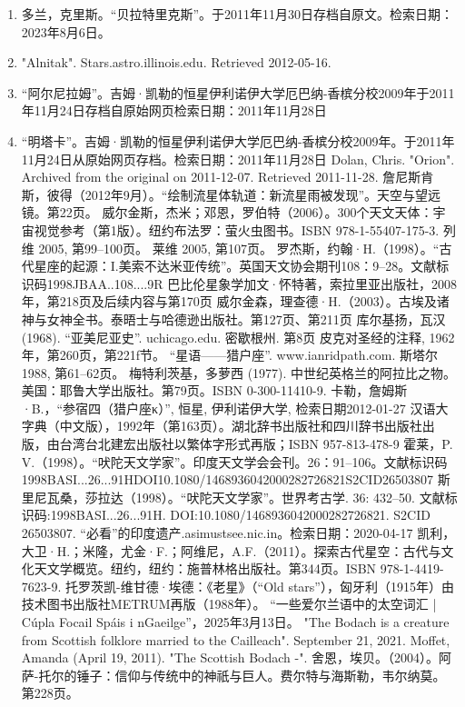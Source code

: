 \begin{enumerate}
\item 多兰，克里斯。“贝拉特里克斯”。于2011年11月30日存档自原文。检索日期：2023年8月6日。
\item "Alnitak". Stars.astro.illinois.edu. Retrieved 2012-05-16.
\item “阿尔尼拉姆”。吉姆·凯勒的恒星伊利诺伊大学厄巴纳-香槟分校2009年于2011年11月24日存档自原始网页检索日期：2011年11月28日
\item “明塔卡”。吉姆·凯勒的恒星伊利诺伊大学厄巴纳-香槟分校2009年。于2011年11月24日从原始网页存档。检索日期：2011年11月28日
 Dolan, Chris. "Orion". Archived from the original on 2011-12-07. Retrieved 2011-11-28.
 詹尼斯肯斯，彼得（2012年9月）。“绘制流星体轨道：新流星雨被发现”。天空与望远镜。第22页。
 威尔金斯，杰米；邓恩，罗伯特（2006）。300个天文天体：宇宙视觉参考（第1版）。纽约布法罗：萤火虫图书。ISBN 978-1-55407-175-3.
 列维 2005, 第99–100页。
 莱维 2005, 第107页。
 罗杰斯，约翰·H.（1998）。“古代星座的起源：I.美索不达米亚传统”。英国天文协会期刊108：9–28。文献标识码1998JBAA..108....9R
 巴比伦星象学加文·怀特著，索拉里亚出版社，2008年，第218页及后续内容与第170页
 威尔金森，理查德·H.（2003）。古埃及诸神与女神全书。泰晤士与哈德逊出版社。第127页、第211页
 库尔基扬，瓦汉 (1968). “亚美尼亚史”. uchicago.edu. 密歇根州. 第8页
 皮克对圣经的注释, 1962年，第260页，第221f节。
 “星语——猎户座”. www.ianridpath.com.
 斯塔尔 1988, 第61–62页。
 梅特利茨基，多萝西 (1977). 中世纪英格兰的阿拉比之物。美国：耶鲁大学出版社。第79页。ISBN 0-300-11410-9.
 卡勒，詹姆斯·B.，“参宿四（猎户座κ）”, 恒星, 伊利诺伊大学, 检索日期2012-01-27
 汉语大字典（中文版），1992年（第163页）。湖北辞书出版社和四川辞书出版社出版，由台湾台北建宏出版社以繁体字形式再版；ISBN 957-813-478-9
 霍莱，P. V.（1998）。“吠陀天文学家”。印度天文学会会刊。26：91–106。文献标识码1998BASI...26...91HDOI10.1080/1468936042000282726821S2CID26503807
 斯里尼瓦桑，莎拉达（1998）。“吠陀天文学家”。世界考古学. 36: 432–50. 文献标识码:1998BASI...26...91H. DOI:10.1080/1468936042000282726821. S2CID 26503807.
 “必看”的印度遗产.asimustsee.nic.in。检索日期：2020-04-17
 凯利，大卫·H.；米隆，尤金·F.；阿维尼，A.F.（2011）。探索古代星空：古代与文化天文学概览。纽约，纽约：施普林格出版社。第344页。ISBN 978-1-4419-7623-9.
 托罗茨凯-维甘德·埃德：《老星》（“Old stars”），匈牙利（1915年）由技术图书出版社METRUM再版（1988年）。
 “一些爱尔兰语中的太空词汇 | Cúpla Focail Spáis i nGaeilge”，2025年3月13日。
 "The Bodach is a creature from Scottish folklore married to the Cailleach". September 21, 2021.
 Moffet, Amanda (April 19, 2011). "The Scottish Bodach -".
 舍恩，埃贝。（2004）。阿萨-托尔的锤子：信仰与传统中的神祇与巨人。费尔特与海斯勒，韦尔纳莫。第228页。

\end{enumerate}
